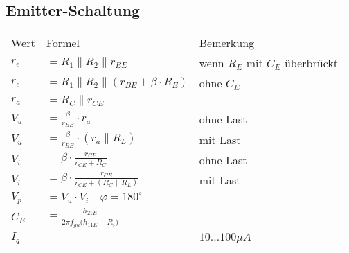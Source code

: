 \subsection{Emitter-Schaltung}
    \begin{minipage}{0.6\columnwidth}
        \renewcommand{\arraystretch}{0.9}
        \begin{table}[H]
            \begin{tabularx}{\columnwidth}{l l l}
                Wert  & Formel                                                  & Bemerkung \\
                $r_e$ & $=R_1\parallel R_2\parallel r_{BE}$                     & wenn $R_E$ mit $C_E$ überbrückt \\
                $r_e$ & $=R_1\parallel R_2\parallel (r_{BE}+\beta\cdot R_E)$    & ohne $C_E$ \\
                $r_a$ & $=R_C\parallel r_{CE}$                                  & \\
                $V_u$ & $=\frac{\beta}{r_{BE}}\cdot r_a$                        & ohne Last \\
                $V_u$ & $=\frac{\beta}{r_{BE}}\cdot (r_a\parallel R_L)$         & mit Last \\
                $V_i$ & $=\beta\cdot\frac{r_{CE}}{r_{CE}+R_C}$                  & ohne Last \\
                $V_i$ & $=\beta\cdot\frac{r_{CE}}{r_{CE}+(R_C\parallel R_L)}$   & mit Last \\
                $V_p$ & $=V_u\cdot V_i\quad \varphi=180^{\circ}$                & \\ %
                $C_E$ & $=\frac{h_{21E}}{2\pi f_{gu}\dot (h_{11E}+R_i)}$        & \\
                $I_q$ &                                                         & $10\dots100\mu A$\\
            \end{tabularx}
        \end{table}
    \end{minipage}    
    \begin{minipage}{0.4\columnwidth}
        \vspace*{3cm}
    \end{minipage}
    
